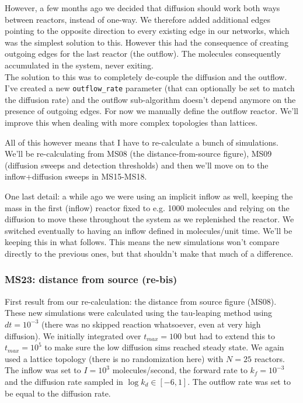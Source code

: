 \documentclass[11pt]{article}
\begin{document}
However, a few months ago we decided that diffusion should work both ways between reactors, instead of one-way. We therefore added additional edges pointing to the opposite direction to every existing edge in our networks, which was the simplest solution to this. However this had the consequence of creating outgoing edges for the last reactor (the outflow). The molecules consequently accumulated in the system, never exiting.\\

The solution to this was to completely de-couple the diffusion and the outflow. I’ve created a new \verb|outflow_rate| parameter (that can optionally be set to match the diffusion rate) and the outflow sub-algorithm doesn’t depend anymore on the presence of outgoing edges. For now we manually define the outflow reactor. We’ll improve this when dealing with more complex topologies than lattices.

All of this however means that I have to re-calculate a bunch of simulations. We’ll be re-calculating from MS08 (the distance-from-source figure), MS09 (diffusion sweeps and detection thresholds) and then we’ll move on to the inflow+diffusion sweeps in MS15-MS18.

One last detail: a while ago we were using an implicit inflow as well, keeping the mass in the first (inflow) reactor fixed to e.g. 1000 molecules and relying on the diffusion to move these throughout the system as we replenished the reactor. We switched eventually to having an inflow defined in molecules/unit time. We’ll be keeping this in what follows. This means the new simulations won’t compare directly to the previous ones, but that shouldn’t make that much of a difference.

\clearpage

\subsubsection{MS23: distance from source (re-bis)}

First result from our re-calculation: the distance from source figure (MS08). These new simulations were calculated using the tau-leaping method using $dt=10^{-3}$ (there was no skipped reaction whatsoever, even at very high diffusion). We initially integrated over $t_{max}=100$ but had to extend this to $t_{max}=10^5$ to make sure the low diffusion sims reached steady state. We again used a lattice topology (there is no randomization here) with $N=25$ reactors. The inflow was set to $I=10^3$ molecules/second, the forward rate to $k_f=10^{-3}$ and the diffusion rate sampled in $\log k_d \in [-6, 1]$. The outflow rate was set to be equal to the diffusion rate.
\end{document}
